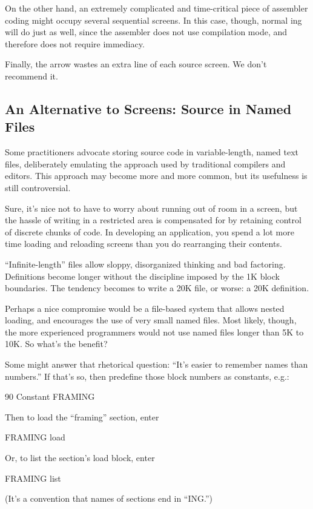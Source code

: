 On the other hand, an extremely complicated and time-critical piece
of assembler coding might occupy several sequential screens.  In this
case, though, normal ing will do just as well, since the
assembler does not use compilation mode, and therefore does not
require immediacy.

Finally, the arrow wastes an extra line of each source screen.  We
don't recommend it.%
%
%
%
%

\subsection{An Alternative to Screens: Source in Named Files}%

%
Some \Forth{} practitioners advocate storing source code in
variable-length, named text files, deliberately emulating the approach
used by traditional compilers and editors.  This approach may become
more and more common, but its usefulness is still controversial.

Sure, it's nice not to have to worry about running out of room in a
screen, but the hassle of writing in a restricted area is compensated
for by retaining control of discrete chunks of code.  In developing an
application, you spend a lot more time loading and reloading screens
than you do rearranging their contents.

``Infinite-length'' files allow sloppy, disorganized thinking and bad
factoring.  Definitions become longer without the discipline imposed
by the 1K block boundaries.  The tendency becomes to write a 20K file,
or worse: a 20K definition.

Perhaps a nice compromise would be a file-based system that allows
nested loading, and encourages the use of very small named files.
Most likely, though, the more experienced \Forth{} programmers would
not use named files longer than 5K to 10K.  So what's the benefit?%

Some might answer that rhetorical question: ``It's easier to remember
names than numbers.'' If that's so, then predefine those block numbers
as constants, e.g.:
\begin{Code}
90 Constant FRAMING
\end{Code}
Then to load the ``framing'' section, enter
\begin{Code}
FRAMING load
\end{Code}
Or, to list the section's load block, enter
\begin{Code}
FRAMING list
\end{Code}
(It's a convention that names of sections end in ``ING.'')

